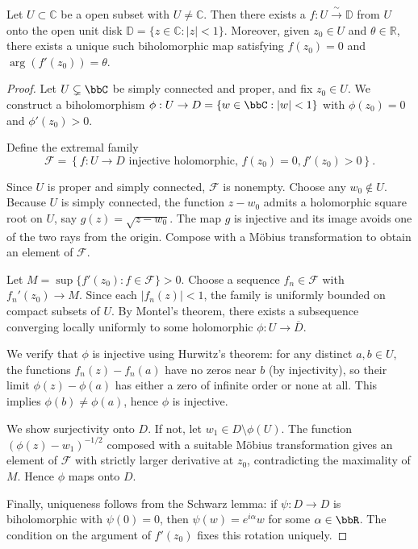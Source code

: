 \begin{theorem} \label{theorem:the_riemann_mapping_theorem_stATING_that_any_simply_connected_proper_open_subset_OF_THE_complex_plane_is_biholomorphic_to_the_open_unit_disk}
Let $U \subset \mathbb{C}$ be a  open subset with $U \neq \mathbb{C}$. 
Then there exists a 
$f : U \xrightarrow{\;\sim\;} \mathbb{D}$
from $U$ onto the open unit disk $\mathbb{D} = \{z \in \mathbb{C} : |z| < 1\}$. Moreover, given $z_0 \in U$ and $\theta \in \mathbb{R}$, there exists a unique such biholomorphic map satisfying $f(z_0) = 0$ and $\arg(f'(z_0)) = \theta$.
\end{theorem}

\begin{proof}
    Let $U \subsetneq \bbC$ be simply connected and proper, and fix $z_0 \in U$. We construct a biholomorphism $\phi : U \to D = \{w \in \bbC : |w| < 1\}$ with $\phi(z_0) = 0$ and $\phi'(z_0) > 0$.

    Define the extremal family
    $$\mathcal{F} = \left\{f : U \to D \text{ injective holomorphic, } f(z_0) = 0, f'(z_0) > 0\right\}.$$

    Since $U$ is proper and simply connected, $\mathcal{F}$ is nonempty. Choose any $w_0 \notin U$. Because $U$ is simply connected, the function $z - w_0$ admits a holomorphic square root on $U$, say $g(z) = \sqrt{z - w_0}$. The map $g$ is injective and its image avoids one of the two rays from the origin. Compose with a Möbius transformation to obtain an element of $\mathcal{F}$.

    Let $M = \sup\{f'(z_0) : f \in \mathcal{F}\} > 0$. Choose a sequence $f_n \in \mathcal{F}$ with $f_n'(z_0) \to M$. Since each $|f_n(z)| < 1$, the family is uniformly bounded on compact subsets of $U$. By Montel's theorem, there exists a subsequence converging locally uniformly to some holomorphic $\phi : U \to \overline{D}$.

    We verify that $\phi$ is injective using Hurwitz's theorem: for any distinct $a, b \in U$, the functions $f_n(z) - f_n(a)$ have no zeros near $b$ (by injectivity), so their limit $\phi(z) - \phi(a)$ has either a zero of infinite order or none at all. This implies $\phi(b) \neq \phi(a)$, hence $\phi$ is injective.

    We show surjectivity onto $D$. If not, let $w_1 \in D \setminus \phi(U)$. The function $(\phi(z) - w_1)^{-1/2}$ composed with a suitable Möbius transformation gives an element of $\mathcal{F}$ with strictly larger derivative at $z_0$, contradicting the maximality of $M$. Hence $\phi$ maps onto $D$.

    Finally, uniqueness follows from the Schwarz lemma: if $\psi : D \to D$ is biholomorphic with $\psi(0) = 0$, then $\psi(w) = e^{i\alpha}w$ for some $\alpha \in \bbR$. The condition on the argument of $f'(z_0)$ fixes this rotation uniquely.
\end{proof}
